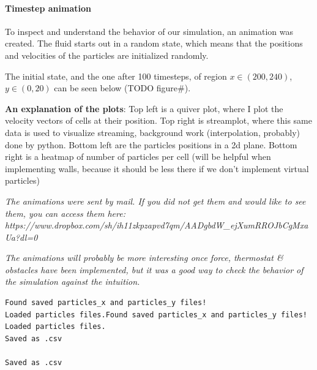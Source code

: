 \documentclass[
]{article}
\begin{document}
\hypertarget{timestep-animation}{%
\paragraph{Timestep animation}\label{timestep-animation}}

To inspect and understand the behavior of our simulation, an animation
was created. The fluid starts out in a random state, which means that
the positions and velocities of the particles are initialized randomly.

The initial state, and the one after 100 timesteps, of region
\(x \in (200, 240)\), \(y \in (0, 20)\) can be seen below (TODO
figure\#).

\textbf{An explanation of the plots}: Top left is a quiver plot, where I
plot the velocity vectors of cells at their position. Top right is
streamplot, where this same data is used to visualize streaming,
background work (interpolation, probably) done by python. Bottom left
are the particles positions in a 2d plane. Bottom right is a heatmap of
number of particles per cell (will be helpful when implementing walls,
because it should be less there if we don't implement virtual particles)

\emph{The animations were sent by mail. If you did not get them and
would like to see them, you can access them here:
https://www.dropbox.com/sh/ih11zkpzapvd7qm/AADgbdW\_ejXumRROJbCgMxaUa?dl=0}

\emph{The animations will probably be more interesting once force,
thermostat \& obstacles have been implemented, but it was a good way to
check the behavior of the simulation against the intuition.}

\begin{verbatim}
Found saved particles_x and particles_y files!
Loaded particles files.Found saved particles_x and particles_y files!
Loaded particles files.
Saved as .csv

Saved as .csv
\end{verbatim}
\end{document}
